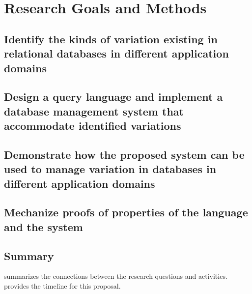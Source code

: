 \section{Research Goals and Methods}
\label{sec:goals}

\subsection{Identify the kinds of variation existing in relational databases in 
different application domains}
\label{sec:ro1}

\subsection{Design a query language and implement a database management 
system that accommodate identified variations}
\label{sec:ro2}

\subsection{Demonstrate how the proposed system can be used to manage
variation in databases in different application domains}
\label{sec:ro3}


\subsection{Mechanize proofs of properties of the language and the system}
\label{sec:ro4}




\subsection{Summary}
\label{sec:sum}

 summarizes the connections between the research questions and activities.
 provides the timeline for this proposal.

